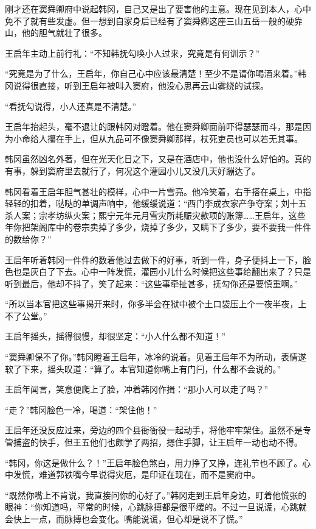 刚才还在窦舜卿府中说起韩冈，自己又是出了要害他的主意。现在见到本人，心中免不了就有些发虚。但一想到自家身后已经有了窦舜卿这座三山五岳一般的硬靠山，他的胆气就壮了很多。

王启年主动上前行礼：“不知韩抚勾唤小人过来，究竟是有何训示？”

“究竟是为了什么，王启年，你自己心中应该最清楚！至少不是请你喝酒来着。”韩冈说得很直接，听到王启年被叫入窦府，他没心思再云山雾绕的试探。

“看抚勾说得，小人还真是不清楚。”

王启年抬起头，毫不退让的跟韩冈对瞪着。他在窦舜卿面前吓得瑟瑟而斗，那是因为小命给人攥在手上，但从九品可不像窦舜卿那样，杖死吏员也可以若无其事。

韩冈虽然凶名外著，但在光天化日之下，又是在酒店中，他也没什么好怕的。真的有事，躲到窦府里去就行了，何况这个灌园小儿又没几天好蹦达了。

韩冈看着王启年胆气甚壮的模样，心中一片雪亮。他冷笑着，右手搭在桌上，中指轻轻的扣着，哒哒的单调声响中，他缓缓说道：“西门李成衣家产争夺案；刘十五杀人案；宗孝坊纵火案；熙宁元年元月雪灾所耗赈灾款项的账簿……王启年，这些年你把架阁库中的卷宗卖掉了多少，烧掉了多少，又瞒下了多少，要不要我一件件的数给你？”

王启年听着韩冈一件件的数着他过去做下的好事，听到一件，身子便抖上一下，脸色也是灰白了下去。心中一阵发慌，灌园小儿什么时候把这些事给翻出来了？只是听到最后，他却不抖了，笑了起来：“这些事牵扯甚多，抚勾你还是要慎重啊。”

“所以当本官把这些事揭开来时，你多半会在狱中被个土口袋压上个一夜半夜，上不了公堂。”

王启年摇头，摇得很慢，却很坚定：“小人什么都不知道！”

“窦舜卿保不了你。”韩冈瞪着王启年，冰冷的说着。见着王启年不为所动，表情遂软了下来，摇头叹道：“算了。本官知道你嘴上有门闩，什么都不会说的。”

王启年闻言，笑意便爬上了脸，冲着韩冈作揖：“那小人可以走了吗？”

“走？”韩冈脸色一冷，喝道：“架住他！”

王启年还没反应过来，旁边的四个县衙衙役一起动手，将他牢牢架住。虽然不是专管捕盗的快手，但王五他们也颇学了两招，摁住手脚，让王启年一动也动不得。

“韩冈，你这是做什么？！”王启年脸色煞白，用力挣了又挣，连礼节也不顾了。心中发慌，难道郭铁嘴今早说得灾厄，是印证在现在，而不是窦府中。

“既然你嘴上不肯说，我直接问你的心好了。”韩冈走到王启年身边，盯着他慌张的眼神：“你知道吗，平常的时候，心跳脉搏都是很平缓的。不过一旦说谎，心跳就会快上一点，而脉搏也会变化。嘴能说谎，但心却是说不了慌。”

